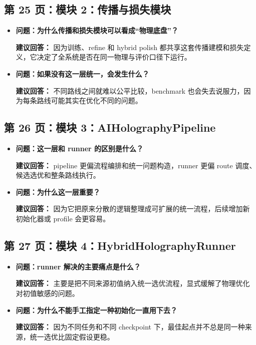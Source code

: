 \documentclass[12pt,a4paper]{ctexart}
\begin{document}
\subsection{第 25 页：模块 2：传播与损失模块}
\begin{itemize}
\item \textbf{问题：为什么传播和损失模块可以看成“物理底盘”？}

\textbf{建议回答：} 因为训练、refine 和 hybrid polish 都共享这套传播建模和损失定义，它决定了全系统是否在同一物理与评价口径下运行。

\item \textbf{问题：如果没有这一层统一，会发生什么？}

\textbf{建议回答：} 不同路线之间就难以公平比较，benchmark 也会失去说服力，因为每条路线可能其实在优化不同的问题。
\end{itemize}

\subsection{第 26 页：模块 3：AIHolographyPipeline}
\begin{itemize}
\item \textbf{问题：这一层和 runner 的区别是什么？}

\textbf{建议回答：} pipeline 更偏流程编排和统一问题构造，runner 更偏 route 调度、候选选优和整条路线执行。

\item \textbf{问题：为什么这一层重要？}

\textbf{建议回答：} 因为它把原来分散的逻辑整理成可扩展的统一流程，后续增加新初始化器或 profile 会更容易。
\end{itemize}

\subsection{第 27 页：模块 4：HybridHolographyRunner}
\begin{itemize}
\item \textbf{问题：runner 解决的主要痛点是什么？}

\textbf{建议回答：} 主要是把不同来源初值纳入统一选优流程，显式缓解了物理优化对初值敏感的问题。

\item \textbf{问题：为什么不能手工指定一种初始化一直用下去？}

\textbf{建议回答：} 因为不同任务和不同 checkpoint 下，最佳起点并不总是同一种来源，统一选优比固定假设更稳。
\end{itemize}
\end{document}
